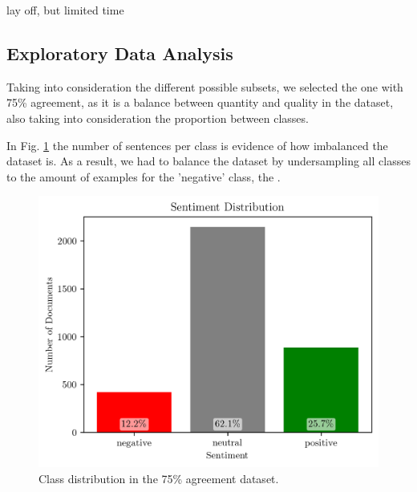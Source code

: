 \documentclass[conference]{IEEEtran}
\begin{document}
lay off, but limited time



\subsection{Exploratory Data Analysis}

Taking into consideration the different possible subsets, we selected the one with 75\% agreement, as it is a balance between quantity and quality in the dataset, also taking into consideration the proportion between classes.

In Fig. \ref{fig:sentiment_distribution} the number of sentences per class is evidence of how imbalanced the dataset is. As a result, we had to balance the dataset by undersampling all classes to the amount of examples for the 'negative' class, the .


\begin{figure}[H]
    \centering
    \includegraphics[width=1\linewidth]{assets/sentiment_distribution.png}
    \caption{Class distribution in the 75\% agreement dataset.}
    \label{fig:sentiment_distribution}
\end{figure}
\end{document}

